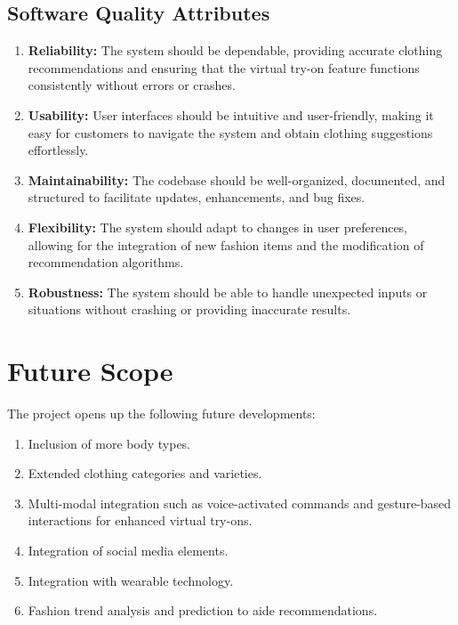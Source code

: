 	\subsection{Software Quality Attributes}
		\begin{enumerate}
			\item \textbf{Reliability:} The system should be dependable, providing accurate clothing recommendations and ensuring that the virtual try-on feature functions consistently without errors or crashes.
			\item \textbf{Usability:} User interfaces should be intuitive and user-friendly, making it easy for customers to navigate the system and obtain clothing suggestions effortlessly.
			\item \textbf{Maintainability:} The codebase should be well-organized, documented, and structured to facilitate updates, enhancements, and bug fixes.
			\item \textbf{Flexibility:} The system should adapt to changes in user preferences, allowing for the integration of new fashion items and the modification of recommendation algorithms.
			\item \textbf{Robustness:} The system should be able to handle unexpected inputs or situations without crashing or providing inaccurate results.
		\end{enumerate}

\section{Future Scope}
	The project opens up the following future developments:

	\begin{enumerate}
		\item Inclusion of more body types.
		\item Extended clothing categories and varieties.
		\item Multi-modal integration such as voice-activated commands and gesture-based interactions for enhanced virtual try-ons.
		\item Integration of social media elements.
		\item Integration with wearable technology.
		\item Fashion trend analysis and prediction to aide recommendations.
	\end{enumerate}